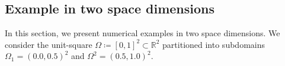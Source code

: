 \documentclass[sn-mathphys-num]{sn-jnl}
\numberwithin{equation}{section}
\begin{document}
\begin{comment}
                \draw[dashed,gray,very thick] (0.4,-2) -- (0.4,2);
                \draw[dashed,gray,very thick] (0.63188,-2) -- (0.63188,2);
                \node [draw=none] at (axis description cs:0.38,0.65) {\color{gray} $\Gamma_1$};
                \node [draw=none] at (axis description cs:0.71,0.65) {\color{gray} $\Gamma_2$};
                \node [draw=none] at (axis description cs:0.2,0.15) {\color{gray} $\omega$};
                \node [draw=none] at (axis description cs:0.8,0.15) {\color{gray} $\omega$};
                

            \end{groupplot}
        \end{tikzpicture}
    \end{center}
    \caption{Exact solution (left) and approximated solution with $k = 3$ (right) of \eqref{eq:1D:exact:simpleMult} at $t = 0.25$ with $c_1 = c_3 = 11.5$ and $c_2 = 1.0$ (uniform mesh), computed with $64$ points in space, $32$ in time and $T = 0.5$.}
    \label{fig:jumpCoefs:multipleJumps3}
  \end{figure}
\end{comment}





\subsection{Example in two space dimensions}
\noindent In this section, we present numerical examples in two space dimensions. We consider the unit-square $\Omega \coloneqq [0,1]^2 \subset \mathbb{R}^2$ partitioned into subdomains $\Omega_1 = (0.0,0.5)^2$ and $\Omega^2 = (0.5,1.0)^2$. 
\end{document}
